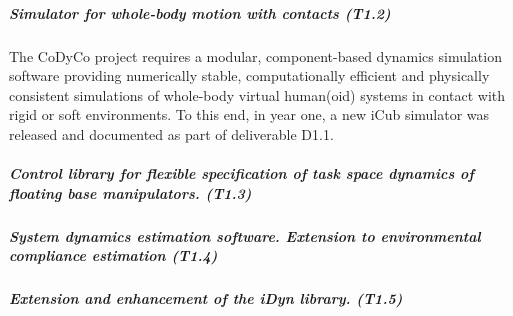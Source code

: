\subparagraph{Simulator for whole-body motion with contacts (T1.2)}

The CoDyCo project requires a modular, component-based dynamics simulation
software providing numerically stable, computationally efficient and
physically consistent simulations of whole-body virtual human(oid) systems in
contact with rigid or soft environments.  To this end, in year one, a new iCub
simulator was released and documented as part of deliverable D1.1.


\subparagraph{Control library for flexible specification of task space
  dynamics of floating base manipulators. (T1.3)}



\subparagraph{System dynamics estimation software. Extension to
environmental compliance estimation (T1.4)}

  
\subparagraph{Extension and enhancement of the iDyn library. (T1.5)}
\label{sec:T15}












